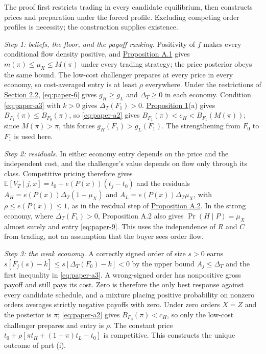 The proof first restricts trading in every candidate equilibrium, then
constructs prices and preparation under the forced profile. Excluding
competing order profiles is necessity; the construction supplies
existence.

\emph{Step 1: beliefs, the floor, and the payoff ranking.} Positivity of
\(f\) makes every conditional flow density positive, and
\hyperref[result-proposition-a-1]{Proposition A.1} gives
\(m(\pi)\le\mu_X\le M(\pi)\) under every trading strategy; the price
posterior obeys the same bound. The low-cost challenger prepares at
every price in every economy, so cost-averaged entry is at least
\(\rho\) everywhere. Under the restrictions of
\hyperref[sec-values-preparation-and-the-sale]{Section 2.2},
\eqref{eq:paper-6} gives \(g_H\ge g_L\) and \(\Delta_T\ge0\) in each
economy. Condition \eqref{eq:paper-a3} with \(k>0\) gives
\(\Delta_T(F_1)>0\).
\hyperref[result-proposition-1]{Proposition 1}(a) gives
\(B_{F_1}(\pi)\le B_{F_0}(\pi)\), so \eqref{eq:paper-a2} gives
\(B_{F_1}(\pi)<c_H<B_{F_1}(M(\pi))\); since \(M(\pi)>\pi\), this forces
\(g_H(F_1)>g_L(F_1)\). The strengthening from \(F_0\) to \(F_1\) is
used here.

\emph{Step 2: residuals.} In either economy entry depends on the price
and the independent cost, and the challenger's value depends on flow
only through its class. Competitive pricing therefore gives
\(\mathbb E[V_T\mid j,x]=t_0+e(P(x))(t_j-t_0)\) and the residuals
\(A_H=e(P(x))\Delta_T(1-\mu_X)\) and \(A_L=e(P(x))\Delta_T\mu_X\), with
\(\rho\le e(P(x))\le1\), as in the residual step of
\hyperref[result-proposition-a-2]{Proposition A.2}. In the strong
economy, where \(\Delta_T(F_1)>0\), Proposition A.2 also gives
\(\Pr(H\mid P)=\mu_X\) almost surely and entry \eqref{eq:paper-9}. This
uses the independence of \(R\) and \(C\) from trading, not an assumption
that the buyer sees order flow.

\emph{Step 3: the weak economy.} A correctly signed order of size
\(s>0\) earns \(s[F_j(s)-k]\le s[\Delta_T(F_0)-k]<0\) by the upper
bound \(A_j\le\Delta_T\) and the first inequality in
\eqref{eq:paper-a3}. A wrong-signed order has nonpositive gross payoff
and still pays its cost. Zero is therefore the only best response
against every candidate schedule, and a mixture placing positive
probability on nonzero orders averages strictly negative payoffs with
zero. Under zero orders \(X=Z\) and the posterior is \(\pi\);
\eqref{eq:paper-a2} gives \(B_{F_0}(\pi)<c_H\), so only the low-cost
challenger prepares and entry is \(\rho\). The constant price
\(t_0+\rho[\pi t_H+(1-\pi)t_L-t_0]\) is competitive. This constructs the
unique outcome of part (i).

